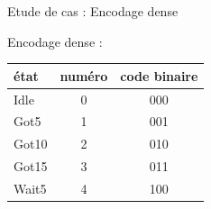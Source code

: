\documentclass[xcolor=table]{beamer}
\begin{document}
\begin{frame}{Etude de cas : Encodage dense}
\begin{minipage}{0.4\textwidth}
\begin{table}
      \centering
      Encodage dense :
      \begin{tabular}{|l|c|c|}
            \hline
            état  & numéro & code binaire  \\ \hline \hline
            Idle  & 0      & 000           \\ \hline
            Got5  & 1      & 001           \\ \hline
            Got10 & 2      & 010           \\ \hline
            Got15 & 3      & 011           \\ \hline
            Wait5 & 4      & 100           \\ \hline
        \end{tabular}
    \end{table}
  \end{minipage}


\end{frame}
\end{document}
